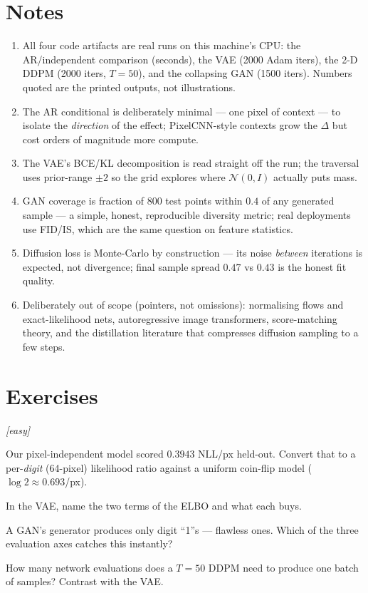 \section*{Notes}
\begin{enumerate}
\item[\textbf{1.}] All four code artifacts are real runs on this
machine's CPU: the AR/independent comparison (seconds), the VAE
(2000 Adam iters), the 2-D DDPM (2000 iters, $T{=}50$), and the
collapsing GAN (1500 iters). Numbers quoted are the printed outputs,
not illustrations.
\item[\textbf{2.}] The AR conditional is deliberately minimal ---
one pixel of context --- to isolate the \emph{direction} of the
effect; PixelCNN-style contexts grow the $\Delta$ but cost orders of
magnitude more compute.
\item[\textbf{3.}] The VAE's BCE/KL decomposition is read straight
off the run; the traversal uses prior-range $\pm2$ so the grid
explores where $\mathcal N(0,I)$ actually puts mass.
\item[\textbf{4.}] GAN coverage is fraction of 800 test points within
$0.4$ of any generated sample --- a simple, honest, reproducible
diversity metric; real deployments use FID/IS, which are the same
question on feature statistics.
\item[\textbf{5.}] Diffusion loss is Monte-Carlo by construction ---
its noise \emph{between} iterations is expected, not divergence;
final sample spread $0.47$ vs $0.43$ is the honest fit quality.
\item[\textbf{6.}] Deliberately out of scope (pointers, not
omissions): normalising flows and exact-likelihood nets, autoregressive
image transformers, score-matching theory, and the distillation
literature that compresses diffusion sampling to a few steps.
\end{enumerate}

\section{Exercises}
\label{sec:genex}

\emph{[easy]}
\begin{exercise}
Our pixel-independent model scored $0.3943$ NLL/px held-out. Convert
that to a per-\emph{digit} (64-pixel) likelihood ratio against a
uniform coin-flip model ($\log 2 \approx 0.693$/px).
\end{exercise}
\begin{exercise}
In the VAE, name the two terms of the ELBO and what each buys.
\end{exercise}
\begin{exercise}
A GAN's generator produces only digit ``1''s --- flawless ones. Which
of the three evaluation axes catches this instantly?
\end{exercise}
\begin{exercise}
How many network evaluations does a $T{=}50$ DDPM need to produce
one batch of samples? Contrast with the VAE.
\end{exercise}

